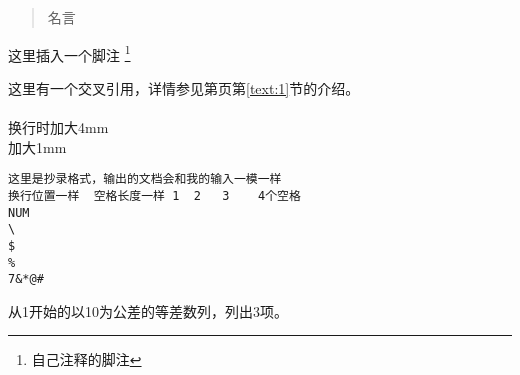 \documentclass{article}
\begin{document}
\begin{quote}
    名言
\end{quote}

这里插入一个脚注
\footnote{自己注释的脚注}

这里有一个交叉引用\label{text:1}，详情参见第\pageref{text:1}页第\ref{text:1}节的介绍。\\

{\\[4mm]
换行时加大4mm\\[1mm]
加大1mm\\}

\begin{verbatim}
这里是抄录格式，输出的文档会和我的输入一模一样
换行位置一样  空格长度一样 1  2   3    4个空格
NUM
\
$
%
7&*@#

\end{verbatim}

从1开始的以10为公差的等差数列，列出3项。
\end{document}
